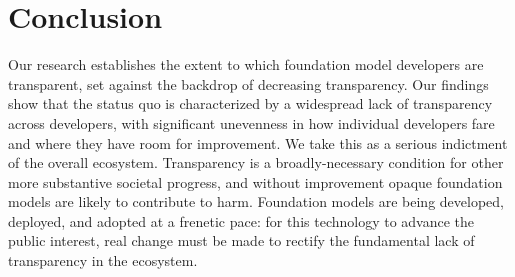 \hypertarget{conclusion}{\section{Conclusion}}
\label{sec:conclusion}
Our research establishes the extent to which foundation model developers are transparent, set against the backdrop of decreasing transparency.
Our findings show that the status quo is characterized by a widespread lack of transparency across developers, with significant unevenness in how individual developers fare and where they have room for improvement.
We take this as a serious indictment of the overall ecosystem.
Transparency is a broadly-necessary condition for other more substantive societal progress, and without improvement opaque foundation models are likely to contribute to harm.
Foundation models are being developed, deployed, and adopted at a frenetic pace: for this technology to advance the public interest, real change must be made to rectify the fundamental lack of transparency in the ecosystem. 
